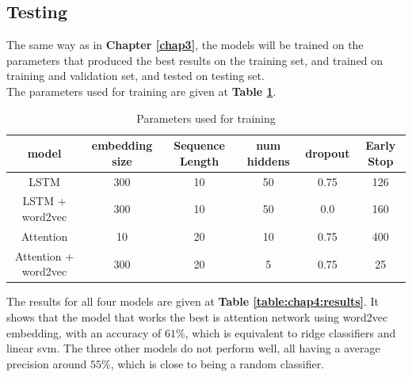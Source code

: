 \subsection{Testing}
The same way as in \textbf{Chapter \ref{chap3}}, the models will be trained on the parameters that produced the best results on the training set, and trained on training and validation set, and tested on testing set. \\
The parameters used for training are given at \textbf{Table \ref{table:chap4:param}}.
\begin{table}[h]
 \begin{tabular}{|c|ccccc|}
 \hline
 model & embedding size & Sequence Length & num hiddens & dropout & Early Stop\\
 \hline
 LSTM & 300 & 10 & 50 & 0.75 & 126\\
 LSTM + word2vec & 300 & 10 & 50 & 0.0 & 160\\
 Attention & 10 & 20 & 10 & 0.75 & 400\\
 Attention + word2vec & 300 & 20 & 5 & 0.75 & 25\\
 \hline
 \end{tabular}
 \caption{Parameters used for training}
 \label{table:chap4:param}
\end{table}
The results for all four models are given at \textbf{Table \ref{table:chap4:results}}. It shows that the model that works the best is attention network using word2vec embedding, with an accuracy of $61\%$, which is equivalent to ridge classifiers and linear svm. The three other models do not perform well, all having a average precision around $55\%$, which is close to being a random classifier. 
